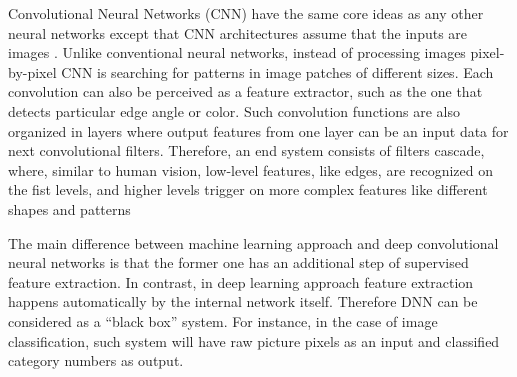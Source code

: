 Convolutional Neural Networks (CNN) have the same core ideas as any other neural networks except that CNN architectures assume that the inputs are images \cite{cs231n-conv}. Unlike conventional neural networks, instead of processing images pixel-by-pixel CNN is searching for patterns in image patches of different sizes. Each convolution can also be perceived as a feature extractor, such as the one that detects particular edge angle or color. Such convolution functions are also organized in layers where output features from one layer can be an input data for next convolutional filters. Therefore, an end system consists of filters cascade, where, similar to human vision, low-level features, like edges, are recognized on the fist levels, and higher levels trigger on more complex features like different shapes and patterns~\cite{Zeiler2014VisualizingNets}

The main difference between machine learning approach and deep convolutional neural networks is that the former one has an additional step of supervised feature extraction. In contrast, in deep learning approach feature extraction happens automatically by the internal network itself. Therefore DNN can be considered as a ``black box'' system. For instance, in the case of image classification, such system will have raw picture pixels as an input and classified category numbers as output.

